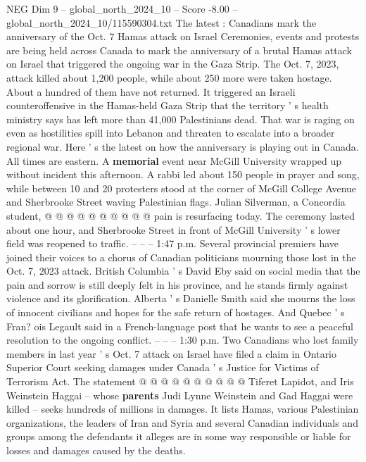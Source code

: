 \begin{textsample}{NEG Dim 9 – global\_north\_2024\_10 – Score -8.00 – global\_north\_2024\_10/115590304.txt}  \label{ex:f9_neg_050}
The latest : Canadians mark the anniversary of the Oct. 7 Hamas attack on Israel Ceremonies, events and protests are being held across Canada to mark the anniversary of a brutal Hamas attack on Israel that triggered the ongoing war in the Gaza Strip.
The Oct. 7, 2023, attack killed about 1,200 people, while about 250 more were taken hostage.
About a hundred of them have not returned.
It triggered an Israeli counteroffensive in the Hamas-held Gaza Strip that the territory ' s health ministry says has left more than 41,000 Palestinians dead.
That war is raging on even as hostilities spill into Lebanon and threaten to escalate into a broader regional war.
Here ' s the latest on how the anniversary is playing out in Canada.
All times are eastern.
A \textbf{memorial} event near McGill University wrapped up without incident this afternoon.
A rabbi led about 150 people in prayer and song, while between 10 and 20 protesters stood at the corner of McGill College Avenue and Sherbrooke Street waving Palestinian flags.
Julian Silverman, a Concordia student, @ @ @ @ @ @ @ @ @ @ pain is resurfacing today.
The ceremony lasted about one hour, and Sherbrooke Street in front of McGill University ' s lower field was reopened to traffic. -- -- -- 1:47 p.m.
Several provincial premiers have joined their voices to a chorus of Canadian politicians mourning those lost in the Oct. 7, 2023 attack.
British Columbia ' s David Eby said on social media that the pain and sorrow is still deeply felt in his province, and he stands firmly against violence and its glorification.
Alberta ' s Danielle Smith said she mourns the loss of innocent civilians and hopes for the safe return of hostages.
And Quebec ' s Fran? ois Legault said in a French-language post that he wants to see a peaceful resolution to the ongoing conflict. -- -- -- 1:30 p.m.
Two Canadians who lost family members in last year ' s Oct. 7 attack on Israel have filed a claim in Ontario Superior Court seeking damages under Canada ' s Justice for Victims of Terrorism Act.
The statement @ @ @ @ @ @ @ @ @ @ Tiferet Lapidot, and Iris Weinstein Haggai -- whose \textbf{parents} Judi Lynne Weinstein and Gad Haggai were killed -- seeks hundreds of millions in damages.
It lists Hamas, various Palestinian organizations, the leaders of Iran and Syria and several Canadian individuals and groups among the defendants it alleges are in some way responsible or liable for losses and damages caused by the deaths.

\end{textsample}
